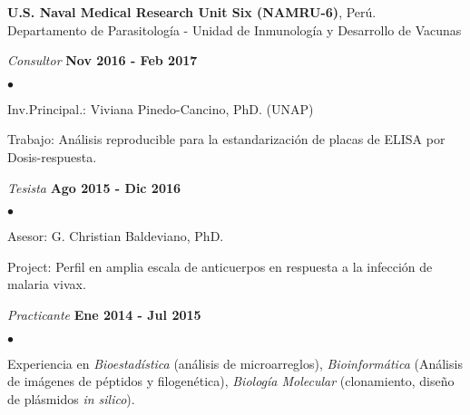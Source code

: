 \documentclass[margin,line]{res}
\newenvironment{list1}{
	\begin{list}{\ding{113}}{%
			\setlength{\itemsep}{0in}
			\setlength{\parsep}{0in} \setlength{\parskip}{0in}
			\setlength{\topsep}{0in} \setlength{\partopsep}{0in}
			\setlength{\leftmargin}{0.17in}}}{\end{list}}
\newenvironment{list2}{
	\begin{list}{$\bullet$}{%
			\setlength{\itemsep}{0in}
			\setlength{\parsep}{0in} \setlength{\parskip}{0in}
			\setlength{\topsep}{0in} \setlength{\partopsep}{0in}
			\setlength{\leftmargin}{0.2in}}}{\end{list}}
\begin{document}
\begin{resume}
		{\bf U.S. Naval Medical Research Unit Six (NAMRU-6)}, Perú.\\
		Departamento de Parasitología - Unidad de Inmunología y Desarrollo de Vacunas\\
		\vspace*{-.1in}
		\begin{list1}
			\item[] {\em Consultor} \hfill {\bf Nov 2016 - Feb 2017}\\
			\vspace*{-.1in}
			\begin{list2}
				\item Inv.Principal.: Viviana Pinedo-Cancino, PhD. (UNAP)
				\item Trabajo: Análisis reproducible para la estandarización de placas de ELISA por Dosis-respuesta.\\
			\end{list2}
			\item[] {\em Tesista} \hfill {\bf Ago 2015 - Dic 2016}\\
			\vspace*{-.1in}
			\begin{list2}
				\item Asesor: G. Christian Baldeviano, PhD.
				\item Project: Perfil en amplia escala de anticuerpos en respuesta a la infección de malaria vivax.\\
			\end{list2}
			\vspace*{-.1in}
			\item[] {\em Practicante} \hfill {\bf Ene 2014 - Jul 2015}\\
			\vspace*{-.1in}
			\begin{list2} %
				\item Experiencia en \textit{Bioestadística} (análisis de microarreglos), \textit{Bioinformática} (Análisis de imágenes de péptidos y filogenética), \textit{Biología Molecular} (clonamiento, diseño de plásmidos \textit{in silico}).
			\end{list2}
		\end{list1}
		

\end{resume}
\end{document}
